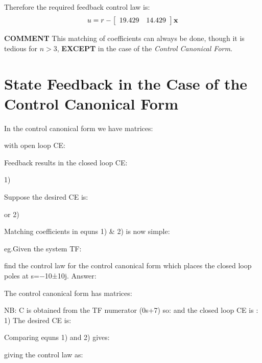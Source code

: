  

Therefore the required feedback control law is:
\[
u = r - \left[ {\begin{array}{*{20}c}
   {19.429} & {14.429}  \\
\end{array}} \right]{\bf{x}}
\]



\textbf{COMMENT}
This matching of coefficients can always be done, though it is tedious for $n>3$, \textbf{EXCEPT} in the case of the \emph{Control Canonical Form}.

 

\section{State Feedback in the Case of the Control Canonical Form} %
\label{sec:state_feedback_in_the_case_of_the_control_canonical_form}


In the control canonical form we have matrices:

 
with open loop CE:
 
Feedback results in the closed loop CE:
 

   1)
 
Suppose the desired CE is:

 

or         2)

Matching coefficients in equns 1)  &  2)  is now simple:

 


 
eg.Given the system TF:
 
find the control law for the control canonical form which places the closed loop poles at s=−10±10j.
Answer:
 
The control canonical form has matrices:
 
NB:  C  is obtained from the TF numerator   (0s+7)
so:    
and the closed loop CE is :
        1)
The desired CE is:
 
Comparing equns  1)  and  2) gives:
 
giving the control law as:   





\endinput


